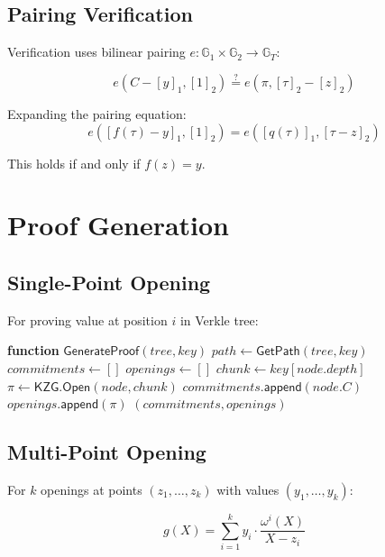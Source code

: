 \documentclass[11pt,a4paper]{article}
\theoremstyle{definition}
\begin{document}
\subsection{Pairing Verification}

Verification uses bilinear pairing $e: \mathbb{G}_1 \times \mathbb{G}_2 \rightarrow \mathbb{G}_T$:

\begin{equation}
    e(C - [y]_1, [1]_2) \stackrel{?}{=} e(\pi, [\tau]_2 - [z]_2)
\end{equation}

Expanding the pairing equation:
\begin{equation}
    e([f(\tau) - y]_1, [1]_2) = e([q(\tau)]_1, [\tau - z]_2)
\end{equation}

This holds if and only if $f(z) = y$.

\section{Proof Generation}

\subsection{Single-Point Opening}

For proving value at position $i$ in Verkle tree:

\begin{algorithmic}[1]
\STATE \textbf{function} $\mathsf{GenerateProof}(tree, key)$
\STATE $path \gets \mathsf{GetPath}(tree, key)$
\STATE $commitments \gets []$
\STATE $openings \gets []$
    \STATE $chunk \gets key[node.depth]$
    \STATE $\pi \gets \mathsf{KZG.Open}(node, chunk)$
    \STATE $commitments.\mathsf{append}(node.C)$
    \STATE $openings.\mathsf{append}(\pi)$
\ENDFOR
\RETURN $(commitments, openings)$
\end{algorithmic}

\subsection{Multi-Point Opening}

For $k$ openings at points $(z_1, \ldots, z_k)$ with values $(y_1, \ldots, y_k)$:

\begin{equation}
    g(X) = \sum_{i=1}^{k} y_i \cdot \frac{\omega^i(X)}{X - z_i}
\end{equation}
\end{document}
